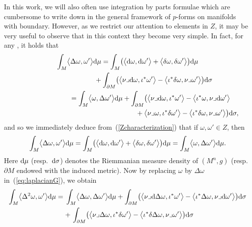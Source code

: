 \documentclass[pdftex]{sigma}
\numberwithin{equation}{section}
\theoremstyle{definition}
\begin{document}
In this work, we will also often use integration by parts formulae which are cumbersome to write down in the general framework of $p$-forms on manifolds with boundary. However, as we restrict our attention to elements in $Z$, it may be very useful to observe that in this context they become very simple.
In fact, for any , it holds that
\begin{gather}
\int_M\bigl\langle\Delta\omega,\omega'\bigr\rangle {\rm d}\mu = \int_M\bigl(\bigl\langle {\rm d}\omega,{\rm d}\omega'\bigr\rangle +\bigl\langle\delta\omega,\delta\omega'\bigr\rangle\bigr) {\rm d}\mu \nonumber\\
\hphantom{\int_M\bigl\langle\Delta\omega,\omega'\bigr\rangle {\rm d}\mu =}{}
+\int_{\partial M}\bigl(\bigl\langle \nu\lrcorner {\rm d}\omega,\iota^*\omega'\bigr\rangle-\bigl\langle\iota^*\delta\omega,\nu\lrcorner\omega'\bigr\rangle\bigr) {\rm d}\sigma \label{eq:laplacianG1}\\
\hphantom{\int_M\bigl\langle\Delta\omega,\omega'\bigr\rangle {\rm d}\mu}{}
= \int_M\bigl\langle\omega,\Delta\omega'\bigr\rangle {\rm d}\mu + \int_{\partial M}\bigl(\bigl\langle\nu\lrcorner
{\rm d}\omega,\iota^*\omega'\bigr\rangle-\bigl\langle\iota^*\omega,\nu\lrcorner
{\rm d}\omega'\bigr\rangle
\nonumber\\
\hphantom{\int_M\bigl\langle\Delta\omega,\omega'\bigr\rangle {\rm d}\mu =\int_M\bigl\langle\omega,\Delta\omega'\bigr\rangle {\rm d}\mu + \int_{\partial M}}{}
+\bigl\langle\nu\lrcorner\omega,
\iota^*\delta\omega'\bigr\rangle-\bigl\langle\iota^*\delta\omega,
\nu\lrcorner\omega'\bigr\rangle\bigr){\rm d}\sigma,\label{eq:laplacianG}
\end{gather}
and so we immediately deduce from~(\ref{Zcharacterization}) that if $\omega,\omega'\in Z$, then
\begin{equation}\label{eq:laplacian}
\int_M\bigl\langle\Delta\omega,\omega'\bigr\rangle {\rm d}\mu=\int_M\bigl(\bigl\langle {\rm d}\omega,{\rm d}\omega'\bigr\rangle+\bigl\langle\delta\omega,\delta\omega'\bigr\rangle\bigr){\rm d}\mu=\int_M\bigl\langle\omega,\Delta\omega'\bigr\rangle {\rm d}\mu.
\end{equation}
Here ${\rm d}\mu$ (resp.\ ${\rm d}\sigma$) denotes the Riemmanian measure density of $(M^n,g)$ (resp.\ $\partial M$ endowed with the induced metric). Now by replacing $\omega$ by $\Delta \omega$ in~(\ref{eq:laplacianG}), we obtain
\begin{align}
\nonumber\int_M\bigl\langle\Delta^2\omega,\omega'\bigr\rangle {\rm d}\mu ={}& \int_M\bigl\langle\Delta \omega,\Delta\omega'\bigr\rangle {\rm d}\mu+\int_{\partial M}\bigl(\bigl\langle\nu\lrcorner {\rm d}\Delta\omega,\iota^*\omega'\bigr\rangle-\bigl\langle\iota^*\Delta\omega,\nu\lrcorner {\rm d}\omega'\bigr\rangle\bigr){\rm d}\sigma\\
 &{}{+}\,\int_{\partial M}\bigl(\bigl\langle\nu\lrcorner\Delta\omega,\iota^*\delta\omega'\bigr\rangle-\bigl\langle\iota^*\delta\Delta\omega,\nu\lrcorner\omega'\bigr\rangle\bigr){\rm d}\sigma\label{eq:partialintegDelta2omega}
\end{align}
\end{document}

